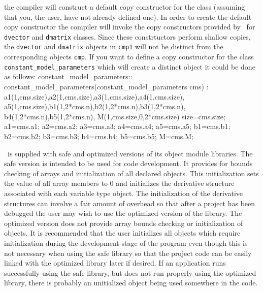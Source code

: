 \documentclass[12pt]{book}
\begin{document}
\noindent the compiler will construct a default copy constructor
for the class 
 (assuming that you,
the user, have not already defined one).
In order to create the default copy constructor the compiler will invoke the 
copy constructors provided by \AD\ for {\tt dvector} and
{\tt dmatrix} classes. Since these constrtuctors perform
shallow copies, the {\tt dvector} and {\tt dmatrix} 
objects in  {\tt cmp1} will not be distinct from the corresponding
objects {\tt cmp}. If you want to define a copy constructor for
the class {\tt constant\_model\_parameters} which will create
a distinct object it could be done as follows:
\beginexample
 constant_model_parameters::
   constant_model_parameters(constant_model_parameters cms) :
   a1(1,cms.size),a2(1,cms.size),a3(1,cms.size),a4(1,cms.size),
   a5(1,cms.size),b1(1,2*cms.n),b2(1,2*cms.n),b3(1,2*cms.n),
   b4(1,2*cms.n),b5(1,2*cms.n), 
   M(1,cms.size,0,2*cms.size) 
 {
   size=cms.size;
   a1=cms.a1; 
   a2=cms.a2; 
   a3=cms.a3; 
   a4=cms.a4; 
   a5=cms.a5; 
   b1=cms.b1; 
   b2=cms.b2; 
   b3=cms.b3; 
   b4=cms.b4; 
   b5=cms.b5; 
   M=cms.M;
 }
\endexample



\endchapter
\htmlnewfile 

\AD\ is supplied with safe and optimized versions
 of its object module libraries.
The safe version is intended to be used for code development.
It provides for bounds checking of arrays and initialization
of all declared objects. This initialization sets the
value of all array members to 0 and initializes the derivative
structure associated with each variable type object.
The initialization of the derivative structures can
involve a fair amount of overhead so that after a project
has been debugged the user may wish to use the optimized version
of the library. The optimized version does not provide array
bounds checking or initialization of objects. 
It is recommended that the user initializes all objects which require
initialization during
the development stage of the program even though this is not
necessary when using the safe library so that the project code can
be easily linked with the optimized library later if desired.
If an application runs successfully using the safe library, but does
not run properly using the optimized library, there is probably
an unitialized object being used somewhere in the code. 
\end{document}

